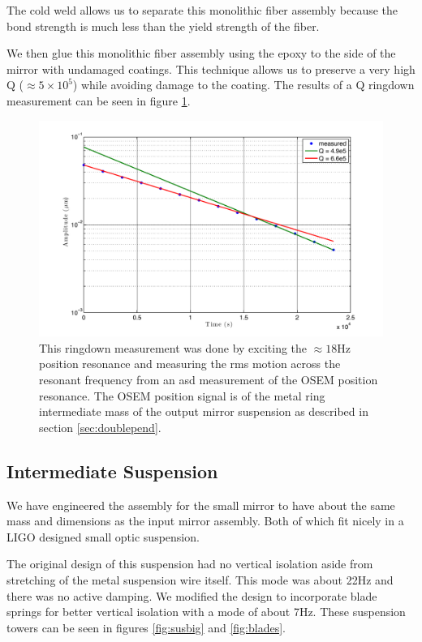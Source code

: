 The cold weld allows us to separate this
monolithic fiber assembly because the bond strength is much less than the
yield strength of the fiber.

We then glue this monolithic fiber assembly using the epoxy to the side of the
mirror with undamaged coatings.
This technique allows us to preserve a very high Q ($\approx 5\times 10^5$)
while avoiding damage to the coating.
The results of a Q ringdown measurement can be seen in
figure \ref{fig:Qmeasurement}. 



\begin{figure}
\centering
\includegraphics[width=15cm]{./figures/Qmeasurement.pdf}
\caption[Q Measurement of Glass Suspension]{
    This ringdown measurement was done by exciting the $\approx 18\mathrm{Hz}$
    position resonance and measuring the rms motion across the resonant
    frequency from an \ac{asd} measurement of the OSEM position resonance.
    The OSEM position signal is of the metal ring intermediate mass of the
    output mirror suspension as described in section \ref{sec:doublepend}.
    }
\label{fig:Qmeasurement}
\end{figure}

\subsection{Intermediate Suspension}

We have engineered the assembly for the small mirror to have about the
same mass and dimensions as the input mirror assembly.
Both of which fit nicely in a LIGO designed small optic suspension.

The original design of this suspension had no vertical isolation aside
from stretching of the metal suspension wire itself.
This mode was about 22Hz and there was no active damping.
We modified the design to incorporate blade springs for better vertical
isolation with a mode of about 7Hz.
These suspension towers can be seen in figures \ref{fig:susbig} and
\ref{fig:blades}.

